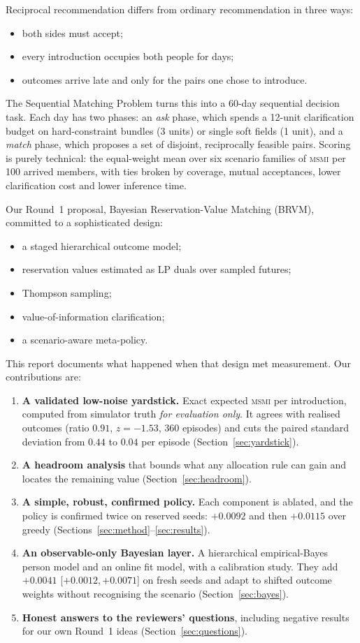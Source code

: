 \documentclass[10pt]{article}
\newcommand{\msmi}{\textsc{msmi}}
\newcommand{\ci}[2]{[$#1$,\,$#2$]}
\begin{document}
Reciprocal recommendation differs from ordinary recommendation in three ways:
\begin{itemize}
\item both sides must accept;
\item every introduction occupies both people for days;
\item outcomes arrive late and only for the pairs one chose to introduce.
\end{itemize}
The Sequential Matching Problem turns this into a 60-day sequential decision task. Each day has two phases: an \emph{ask} phase, which spends a 12-unit clarification budget on hard-constraint bundles (3 units) or single soft fields (1 unit), and a \emph{match} phase, which proposes a set of disjoint, reciprocally feasible pairs. Scoring is purely technical: the equal-weight mean over six scenario families of \msmi{} per 100 arrived members, with ties broken by coverage, mutual acceptances, lower clarification cost and lower inference time.

Our Round~1 proposal, Bayesian Reservation-Value Matching (BRVM), committed to a sophisticated design:
\begin{itemize}
\item a staged hierarchical outcome model;
\item reservation values estimated as LP duals over sampled futures;
\item Thompson sampling;
\item value-of-information clarification;
\item a scenario-aware meta-policy.
\end{itemize}
This report documents what happened when that design met measurement. Our contributions are:
\begin{enumerate}
\item \textbf{A validated low-noise yardstick.} Exact expected \msmi{} per introduction, computed from simulator truth \emph{for evaluation only}. It agrees with realised outcomes (ratio $0.91$, $z=-1.53$, 360 episodes) and cuts the paired standard deviation from $0.44$ to $0.04$ per episode (Section~\ref{sec:yardstick}).
\item \textbf{A headroom analysis} that bounds what any allocation rule can gain and locates the remaining value (Section~\ref{sec:headroom}).
\item \textbf{A simple, robust, confirmed policy.} Each component is ablated, and the policy is confirmed twice on reserved seeds: $+0.0092$ and then $+0.0115$ over greedy (Sections~\ref{sec:method}--\ref{sec:results}).
\item \textbf{An observable-only Bayesian layer.} A hierarchical empirical-Bayes person model and an online fit model, with a calibration study. They add $+0.0041$ \ci{+0.0012}{+0.0071} on fresh seeds and adapt to shifted outcome weights without recognising the scenario (Section~\ref{sec:bayes}).
\item \textbf{Honest answers to the reviewers' questions}, including negative results for our own Round~1 ideas (Section~\ref{sec:questions}).
\end{enumerate}
\end{document}
